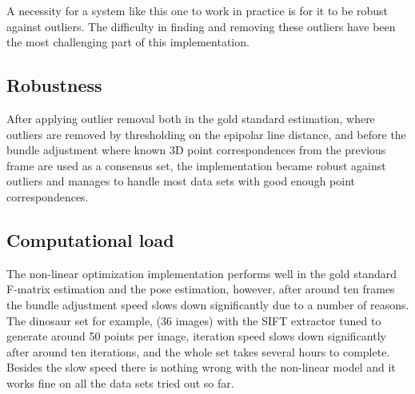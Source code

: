 A necessity for a system like this one to work in practice is for it to be robust against outliers. The difficulty in finding and removing these outliers have been the most challenging part of this implementation.

\subsection{Robustness}
After applying outlier removal both in the gold standard estimation, where outliers are removed by thresholding on the epipolar line distance, and before the bundle adjustment where known 3D point correspondences from the previous frame are used as a consensus set, the implementation became robust against outliers and manages to handle most data sets with good enough point correspondences. 

\subsection{Computational load}
The non-linear optimization implementation performs well in the gold standard F-matrix estimation and the pose estimation, however, after around ten frames the bundle adjustment speed slows down significantly due to a number of reasons. The dinosaur set for example, (36 images) with the SIFT extractor tuned to generate around 50 points per image, iteration speed slows down significantly after around ten iterations, and the whole set takes several hours to complete. Besides the slow speed there is nothing wrong with the non-linear model and it works fine on all the data sets tried out so far.